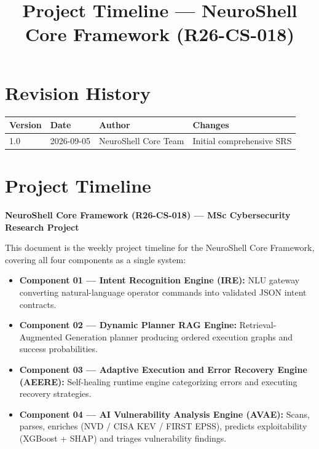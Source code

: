 \documentclass[10pt,journal,onecolumn]{IEEEtran}
\begin{document}
\title{Project Timeline --- NeuroShell Core Framework (R26-CS-018)}
\author{
}

\maketitle

\section*{Revision History}
\begin{center}
\begin{tabularx}{0.9\columnwidth}{l l l X}
\toprule
\textbf{Version} & \textbf{Date} & \textbf{Author} & \textbf{Changes}\\
\midrule
1.0 & 2026-09-05 & NeuroShell Core Team & Initial comprehensive SRS\\
\bottomrule
\end{tabularx}
\end{center}

\tableofcontents

\newpage
\section{Project Timeline}

\textbf{NeuroShell Core Framework (R26-CS-018) --- MSc Cybersecurity Research Project}

This document is the weekly project timeline for the NeuroShell Core Framework, covering all four components as a single system:

\begin{itemize}
\item \textbf{Component 01 --- Intent Recognition Engine (IRE):} NLU gateway converting natural-language operator commands into validated JSON intent contracts.
\item \textbf{Component 02 --- Dynamic Planner RAG Engine:} Retrieval-Augmented Generation planner producing ordered execution graphs and success probabilities.
\item \textbf{Component 03 --- Adaptive Execution and Error Recovery Engine (AEERE):} Self-healing runtime engine categorizing errors and executing recovery strategies.
\item \textbf{Component 04 --- AI Vulnerability Analysis Engine (AVAE):} Scans, parses, enriches (NVD / CISA KEV / FIRST EPSS), predicts exploitability (XGBoost + SHAP) and triages vulnerability findings.
\end{itemize}
\end{document}

